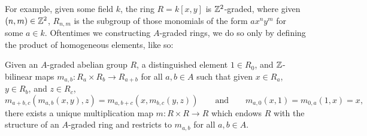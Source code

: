\documentclass[../main.tex]{subfiles}
\begin{document}
For example, given some field $k$, the ring $R=k[x,y]$ is $\mathbb{Z}^2$-graded, where given $(n,m)\in\mathbb{Z}^2$, $R_{n,m}$ is the subgroup of those monomials of the form $ax^ny^m$ for some $a\in k$. Oftentimes we constructing $A$-graded rings, we do so only by defining the product of homogeneous elements, like so:

\begin{proposition}\label{A_graded_ring}
	Given an $A$-graded abelian group $R$, a distinguished element $1\in R_0$, and $\mathbb{Z}$-bilinear maps $m_{a,b}:R_a\times R_b\to R_{a+b}$ for all $a,b\in A$ such that given $x\in R_a$, $y\in R_b$, and $z\in R_c$, 
	\[m_{a+b,c}(m_{a,b}(x,y),z)=m_{a,b+c}(x,m_{b,c}(y,z))\qquad\text{and}\qquad m_{a,0}(x,1)=m_{0,a}(1,x)=x,\]
	there exists a unique multiplication map $m:R\times R\to R$ which endows $R$ with the structure of an $A$-graded ring and restricts to $m_{a,b}$ for all $a,b\in A$.
\end{proposition}
\end{document}
